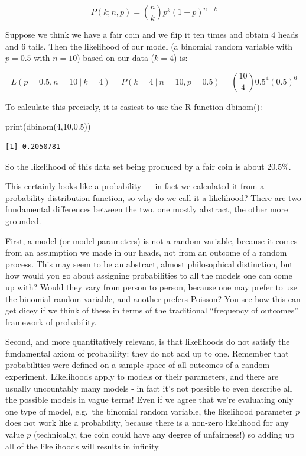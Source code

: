 \documentclass[
  letterpaper,
  DIV=11,
  numbers=noendperiod]{scrreprt}
\newenvironment{Shaded}{\begin{snugshade}}{\end{snugshade}}
\newcommand{\DecValTok}[1]{\textcolor[rgb]{0.68,0.00,0.00}{#1}}
\newcommand{\FloatTok}[1]{\textcolor[rgb]{0.68,0.00,0.00}{#1}}
\newcommand{\FunctionTok}[1]{\textcolor[rgb]{0.28,0.35,0.67}{#1}}
\newcommand{\NormalTok}[1]{\textcolor[rgb]{0.00,0.23,0.31}{#1}}
\begin{document}
\[ 
P(k ; n , p) =  {n \choose k} p^k (1-p)^{n-k}
\]

Suppose we think we have a fair coin and we flip it ten times and obtain
4 heads and 6 tails. Then the likelihood of our model (a binomial random
variable with \(p=0.5\) with \(n=10\)) based on our data (\(k=4\)) is:

\[
L(p=0.5, n=10 \ \vert \ k=4 ) = P(k =4 \ \vert \ n=10 , p=0.5) = {10 \choose 4} 0.5^4 (0.5)^{6}
\]

To calculate this precisely, it is easiest to use the R function
dbinom():

\begin{Shaded}
\begin{Highlighting}[]
\FunctionTok{print}\NormalTok{(}\FunctionTok{dbinom}\NormalTok{(}\DecValTok{4}\NormalTok{,}\DecValTok{10}\NormalTok{,}\FloatTok{0.5}\NormalTok{))}
\end{Highlighting}
\end{Shaded}

\begin{verbatim}
[1] 0.2050781
\end{verbatim}

So the likelihood of this data set being produced by a fair coin is
about 20.5\%.

This certainly looks like a probability --- in fact we calculated it
from a probability distribution function, so why do we call it a
likelihood? There are two fundamental differences between the two, one
mostly abstract, the other more grounded.

First, a model (or model parameters) is not a random variable, because
it comes from an assumption we made in our heads, not from an outcome of
a random process. This may seem to be an abstract, almost philosophical
distinction, but how would you go about assigning probabilities to all
the models one can come up with? Would they vary from person to person,
because one may prefer to use the binomial random variable, and another
prefers Poisson? You see how this can get dicey if we think of these in
terms of the traditional ``frequency of outcomes'' framework of
probability.

Second, and more quantitatively relevant, is that likelihoods do not
satisfy the fundamental axiom of probability: they do not add up to one.
Remember that probabilities were defined on a sample space of all
outcomes of a random experiment. Likelihoods apply to models or their
parameters, and there are usually uncountably many models - in fact it's
not possible to even describe all the possible models in vague terms!
Even if we agree that we're evaluating only one type of model, e.g.~the
binomial random variable, the likelihood parameter \(p\) does not work
like a probability, because there is a non-zero likelihood for any value
\(p\) (technically, the coin could have any degree of unfairness!) so
adding up all of the likelihoods will results in infinity.
\end{document}
